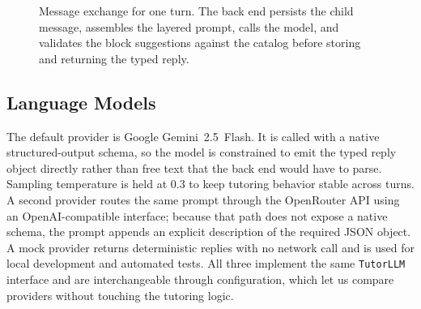 \documentclass[conference]{IEEEtran}
\begin{document}
\begin{figure}[!t]
\centering
{}
\caption{Message exchange for one turn. The back end persists the child message, assembles the layered prompt, calls the model, and validates the block suggestions against the catalog before storing and returning the typed reply.}
\label{fig:sequence}
\end{figure}

\subsection{Language Models}
\label{sec:models}

The default provider is Google Gemini~2.5~Flash. It is called with a native structured-output schema, so the model is constrained to emit the typed reply object directly rather than free text that the back end would have to parse. Sampling temperature is held at 0.3 to keep tutoring behavior stable across turns. A second provider routes the same prompt through the OpenRouter API using an OpenAI-compatible interface; because that path does not expose a native schema, the prompt appends an explicit description of the required JSON object. A mock provider returns deterministic replies with no network call and is used for local development and automated tests. All three implement the same \texttt{TutorLLM} interface and are interchangeable through configuration, which let us compare providers without touching the tutoring logic.
\end{document}
